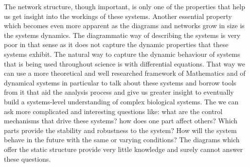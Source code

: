 \documentclass[12pt,a4paper,titlepage]{article}
\begin{document}
The network structure, though important, is only one of the properties that help us get insight into the workings of these systems. Another essential property which becomes even more apparent as the diagrams and networks grow in size is the systems dynamics. The diagrammatic way of describing the systems is very poor in that sense as it does not capture the dynamic properties that these systems exhibit\cite{kitano2002computational}. The natural way to capture the dynamic behaviour of systems that is being used throughout science is with differential equations. That way we can use a more theoretical and well researched framework of Mathematics and of dynamical systems in particular  to talk about these systems and borrow tools from it that aid the analysis process and give us greater insight to eventually build a systems-level understanding of complex biological systems. %
The we can ask more complicated and interesting questions like: what are the control mechanisms that drive these systems? how does one part affect others? Which parts provide the stability and robustness to the system? How will the system behave in the future with the same or varying conditions? The diagrams which offer the static structure provide very little knowledge and surely cannot answer these questions.
\end{document}
